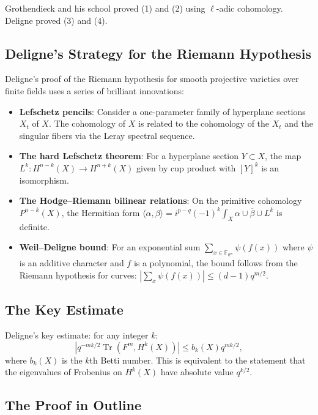 Grothendieck and his school proved (1) and (2) using $\ell$-adic cohomology. Deligne proved (3) and (4).

\subsection{Deligne's Strategy for the Riemann Hypothesis}

Deligne's proof of the Riemann hypothesis for smooth projective varieties over finite fields uses a series of brilliant innovations:
\begin{itemize}
\item \textbf{Lefschetz pencils}: Consider a one-parameter family of hyperplane sections $X_t$ of $X$. The cohomology of $X$ is related to the cohomology of the $X_t$ and the singular fibers via the Leray spectral sequence.
\item \textbf{The hard Lefschetz theorem}: For a hyperplane section $Y \subset X$, the map $L^k: H^{n-k}(X) \to H^{n+k}(X)$ given by cup product with $[Y]^k$ is an isomorphism.
\item \textbf{The Hodge--Riemann bilinear relations}: On the primitive cohomology $P^{n-k}(X)$, the Hermitian form $\langle \alpha, \beta \rangle = i^{p-q} (-1)^{k} \int_X \alpha \cup \overline{\beta} \cup L^k$ is definite.
\item \textbf{Weil--Deligne bound}: For an exponential sum $\sum_{x \in \mathbb{F}_{q^m}} \psi(f(x))$ where $\psi$ is an additive character and $f$ is a polynomial, the bound follows from the Riemann hypothesis for curves: $|\sum_x \psi(f(x))| \leq (d-1) q^{m/2}$.
\end{itemize}

\subsection{The Key Estimate}

Deligne's key estimate: for any integer $k$:
\[
|q^{-mk/2} \operatorname{Tr}(F^m, H^k(X))| \leq b_k(X) q^{mk/2},
\]
where $b_k(X)$ is the $k$th Betti number. This is equivalent to the statement that the eigenvalues of Frobenius on $H^k(X)$ have absolute value $q^{k/2}$.

\subsection{The Proof in Outline}

